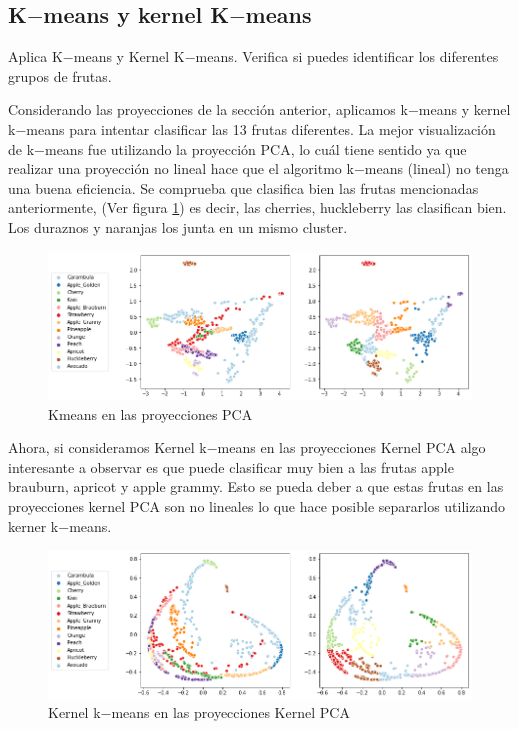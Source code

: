 \documentclass[paper=letter, fontsize=11pt]{scrartcl}
\numberwithin{equation}{section} %
\numberwithin{figure}{section} %
\numberwithin{table}{section} %
\begin{document}
\subsection{K$-$means y kernel K$-$means} Aplica K$−$means y Kernel K$−$means. Verifica si puedes identificar los diferentes grupos de frutas.

Considerando las proyecciones de la sección anterior, aplicamos k$-$means y kernel k$-$means para intentar clasificar las 13 frutas diferentes. La mejor visualización de k$-$means fue utilizando la proyección PCA, lo cuál tiene sentido ya que realizar una proyección no lineal hace que el algoritmo k$-$means (lineal) no tenga una buena eficiencia. Se comprueba que clasifica bien las frutas mencionadas anteriormente,  (Ver figura \ref{fig:kmeans_pca}) es decir, las cherries, huckleberry las clasifican bien. Los duraznos y naranjas los junta en un mismo cluster.

\begin{figure}[H]
    \centering
    \includegraphics[scale=0.6]{figure/kmeans_pca.png}
    \caption{Kmeans en las proyecciones PCA}
    \label{fig:kmeans_pca}
\end{figure}

Ahora, si consideramos Kernel k$-$means en las proyecciones Kernel PCA algo interesante a observar es que puede clasificar muy bien a las frutas apple brauburn, apricot y apple grammy. Esto se pueda deber a que estas frutas en las proyecciones kernel PCA son no lineales lo que hace posible separarlos utilizando kerner k$-$means.
\begin{figure}[H]
    \centering
    \includegraphics[scale=0.6]{figure/k_means_kpca.png}
    \caption{Kernel k$-$means en las proyecciones Kernel PCA}
    \label{fig:k_kmeans_pca}
\end{figure}
\end{document}
